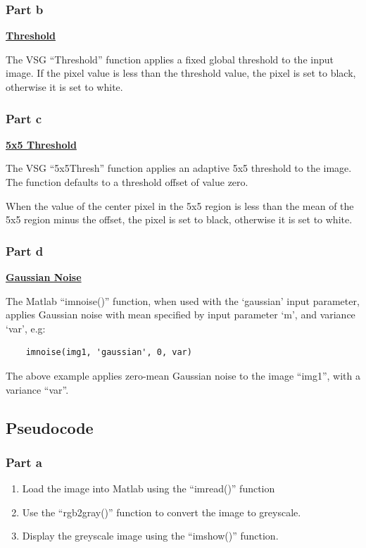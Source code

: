\documentclass[a4paper]{article}
\begin{document}
	\subsubsection{Part b}
	\underline{\textbf{Threshold}}
	\par The VSG ``Threshold'' function applies a fixed global threshold to
	the input image. If the pixel value is less than the threshold value,
	the pixel is set to black, otherwise it is set to white.
	\subsubsection{Part c}
	\underline{\textbf{5x5 Threshold}}
	\par The VSG ``5x5Thresh'' function applies an adaptive 5x5 threshold
	to the image. The function defaults to a threshold offset of value zero.
	\par When the value of the center pixel in the 5x5 region is less than the
	mean of the 5x5 region minus the offset, the pixel is set to black,
	otherwise it is set to white.
	\subsubsection{Part d}
	\underline{\textbf{Gaussian Noise}}
	\par The Matlab ``imnoise()'' function, when used with the `gaussian' input
	parameter, applies Gaussian noise with mean specified by input
	parameter `m', and variance `var', e.g:
	\begin{lstlisting}
	imnoise(img1, 'gaussian', 0, var)
	\end{lstlisting}
	The above example applies zero-mean Gaussian noise to the image
	``img1'', with a variance ``var''.
	\subsection{Pseudocode}
	\subsubsection{Part a}
	\begin{enumerate}
		\item Load the image into Matlab using the ``imread()''
			function
		\item Use the ``rgb2gray()'' function to convert the image to
			greyscale.
		\item Display the greyscale image using the ``imshow()''
			function.
	\end{enumerate}
\end{document}
